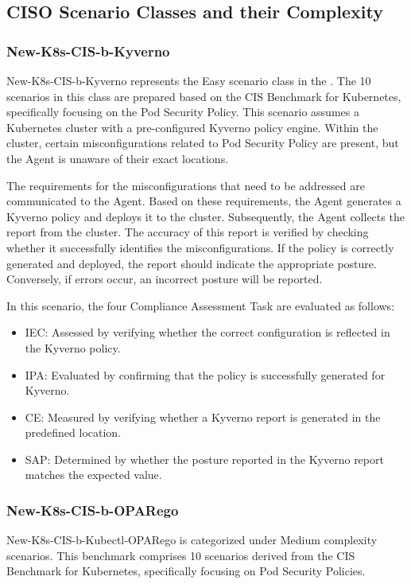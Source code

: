 \subsection{CISO Scenario Classes and their Complexity}
\subsubsection{New-K8s-CIS-b-Kyverno}

New-K8s-CIS-b-Kyverno represents the Easy scenario class in the \bench. The 10 scenarios in this class are prepared based on the CIS Benchmark for Kubernetes, specifically focusing on the Pod Security Policy. This scenario assumes a Kubernetes cluster with a pre-configured Kyverno policy engine. Within the cluster, certain misconfigurations related to Pod Security Policy are present, but the Agent is unaware of their exact locations.

The requirements for the misconfigurations that need to be addressed are communicated to the Agent. Based on these requirements, the Agent generates a Kyverno policy and deploys it to the cluster. Subsequently, the Agent collects the report from the cluster. The accuracy of this report is verified by checking whether it successfully identifies the misconfigurations. If the policy is correctly generated and deployed, the report should indicate the appropriate posture. Conversely, if errors occur, an incorrect posture will be reported.

In this scenario, the four Compliance Assessment Task are evaluated as follows:

\begin{itemize}
\item IEC: Assessed by verifying whether the correct configuration is reflected in the Kyverno policy.
\item IPA: Evaluated by confirming that the policy is successfully generated for Kyverno.
\item CE: Measured by verifying whether a Kyverno report is generated in the predefined location.
\item SAP: Determined by whether the posture reported in the Kyverno report matches the expected value.
\end{itemize}

\subsubsection{New-K8s-CIS-b-OPARego}

New-K8s-CIS-b-Kubectl-OPARego is categorized under Medium complexity scenarios. This benchmark comprises 10 scenarios derived from the CIS Benchmark for Kubernetes, specifically focusing on Pod Security Policies.

